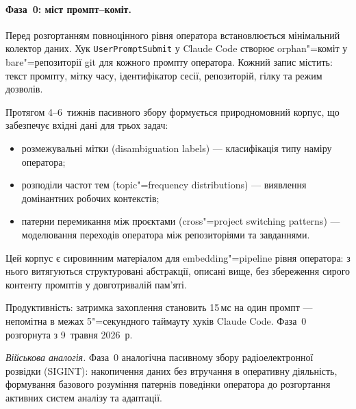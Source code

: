 \paragraph{Фаза~0: міст промпт--коміт.}
Перед розгортанням повноцінного рівня оператора встановлюється мінімальний колектор даних.
Хук \texttt{UserPromptSubmit} у Claude Code створює orphan"=коміт у bare"=репозиторії git для кожного промпту оператора.
Кожний запис містить: текст промпту, мітку часу, ідентифікатор сесії, репозиторій, гілку та режим дозволів.

Протягом 4--6~тижнів пасивного збору формується природномовний корпус, що забезпечує вхідні дані для трьох задач:
\begin{itemize}[nosep]
  \item розмежувальні мітки (disambiguation labels) --- класифікація типу наміру оператора;
  \item розподіли частот тем (topic"=frequency distributions) --- виявлення домінантних робочих контекстів;
  \item патерни перемикання між проєктами (cross"=project switching patterns) --- моделювання переходів оператора між репозиторіями та завданнями.
\end{itemize}

\noindent
Цей корпус є сировинним матеріалом для embedding"=pipeline рівня оператора: з нього витягуються структуровані абстракції, описані вище, без збереження сирого контенту промптів у довготривалій пам'яті.

Продуктивність: затримка захоплення становить 15\,мс на один промпт --- непомітна в межах 5"=секундного таймауту хуків Claude Code.
Фаза~0 розгорнута з 9~травня 2026~р.

\medskip
\noindent\textit{Військова аналогія.}
Фаза~0 аналогічна пасивному збору радіоелектронної розвідки (SIGINT): накопичення даних без втручання в оперативну діяльність, формування базового розуміння патернів поведінки оператора до розгортання активних систем аналізу та адаптації.

